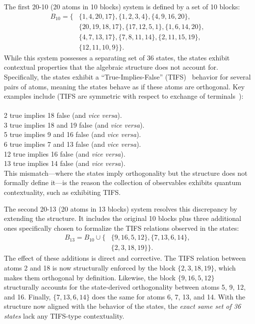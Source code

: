 \documentclass[%
  reprint,
  superscriptaddress,
  showpacs,
  showkeys,
  amsmath,amssymb,
  pra,
  longbibliography,
  floatfix,
  x11names
]{revtex4-2}
\begin{document}
The first 20-10 (20 atoms in 10 blocks) system is defined by a set of 10 blocks:
\begin{align*}
    B_{10} = \{ &\{1, 4, 20, 17\}, \{1, 2, 3, 4\}, \{4, 9, 16, 20\}, \\
    &\{20, 19, 18, 17\}, \{17, 12, 5, 1\}, \{1, 6, 14, 20\}, \\
    &\{4, 7, 13, 17\}, \{7, 8, 11, 14\}, \{2, 11, 15, 19\}, \\
    &\{12, 11, 10, 9\} \}.
\end{align*}
While this system possesses a separating set of 36 states, the states exhibit contextual properties that the algebraic structure does not account for.
Specifically, the states exhibit a ``True-Implies-False'' (TIFS)~\cite{2018-minimalYIYS} behavior for several pairs of atoms,
meaning the states behave as if these atoms are orthogonal. Key examples include (TIFS are symmetric with respect to exchange
of terminals~\cite{svozil-2021-chroma}):
\\ \\
      2 true implies 18 false (and \textit{vice versa}).           \\
      3 true implies  18 and 19 false (and \textit{vice versa}).   \\
      5 true implies  9 and 16 false (and \textit{vice versa}).    \\
      6 true implies  7 and 13 false (and \textit{vice versa}).    \\
      12 true implies 16 false (and \textit{vice versa}).          \\
      13 true implies 14 false (and \textit{vice versa}). \\


This mismatch---where the states imply orthogonality but the structure does not formally define it---is
the reason the collection of observables exhibits quantum contextuality, such as exhibiting TIFS.


The second 20-13 (20 atoms in 13 blocks) system resolves this discrepancy by extending the structure.
It includes the original 10 blocks plus three additional ones specifically chosen to formalize the TIFS relations observed in the states:
\begin{align*}
    B_{13} = B_{10} \cup \bigl\{ &\{9, 16, 5, 12\}, \{7, 13, 6, 14\}, \\
    &\{2, 3, 18, 19\} \bigr\}.
\end{align*}
The effect of these additions is direct and corrective. The TIFS relation between atoms 2 and 18 is now structurally enforced by the block $\{2, 3, 18, 19\}$,
which makes them orthogonal by definition.
 Likewise, the block $\{9, 16, 5, 12\}$ structurally accounts for the state-derived orthogonality between atoms 5, 9, 12, and 16.
Finally, $\{7, 13, 6, 14\}$ does the same for atoms 6, 7, 13, and 14.
With the structure now aligned with the behavior of the states, the \textit{exact same set of 36 states} lack any TIFS-type contextuality.
\end{document}
